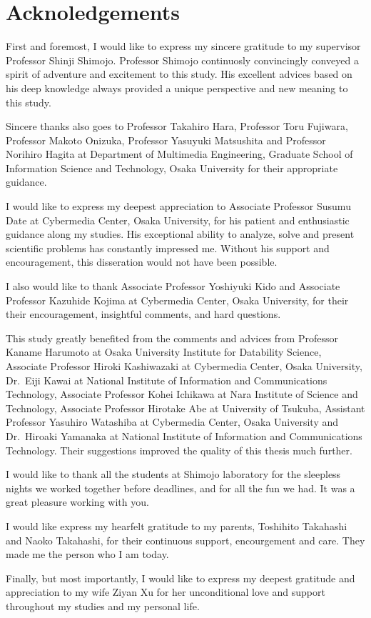 \chapter*{Acknoledgements}

First and foremost, I would like to express my sincere gratitude to my
supervisor Professor Shinji Shimojo. Professor Shimojo continuosly
convincingly conveyed a spirit of adventure and excitement to this study. His
excellent advices based on his deep knowledge always provided a unique
perspective and new meaning to this study.

Sincere thanks also goes to Professor Takahiro Hara, Professor Toru Fujiwara,
Professor Makoto Onizuka, Professor Yasuyuki Matsushita and Professor Norihiro
Hagita at Department of Multimedia Engineering, Graduate School of Information
Science and Technology, Osaka University for their appropriate guidance.

I would like to express my deepest appreciation to Associate Professor Susumu
Date at Cybermedia Center, Osaka University, for his patient and enthusiastic
guidance along my studies. His exceptional ability to analyze, solve and
present scientific problems has constantly impressed me. Without his support
and encouragement, this disseration would not have been possible.

I also would like to thank Associate Professor Yoshiyuki Kido and Associate
Professor Kazuhide Kojima at Cybermedia Center, Osaka University, for their
their encouragement, insightful comments, and hard questions.

This study greatly benefited from the comments and advices from Professor
Kaname Harumoto at Osaka University Institute for Datability Science,
Associate Professor Hiroki Kashiwazaki at Cybermedia Center, Osaka University,
Dr.~Eiji Kawai at National Institute of Information and Communications
Technology, Associate Professor Kohei Ichikawa at Nara Institute of Science
and Technology, Associate Professor Hirotake Abe at University of Tsukuba,
Assistant Professor Yasuhiro Watashiba at Cybermedia Center, Osaka University
and Dr.~Hiroaki Yamanaka at National Institute of Information and
Communications Technology. Their suggestions improved the quality of this
thesis much further.

I would like to thank all the students at Shimojo laboratory for the sleepless
nights we worked together before deadlines, and for all the fun we had. It was
a great pleasure working with you.

I would like express my hearfelt gratitude to my parents, Toshihito Takahashi
and Naoko Takahashi, for their continuous support, encourgement and care. They
made me the person who I am today.

Finally, but most importantly, I would like to express my deepest gratitude
and appreciation to my wife Ziyan Xu for her unconditional love and support
throughout my studies and my personal life.
